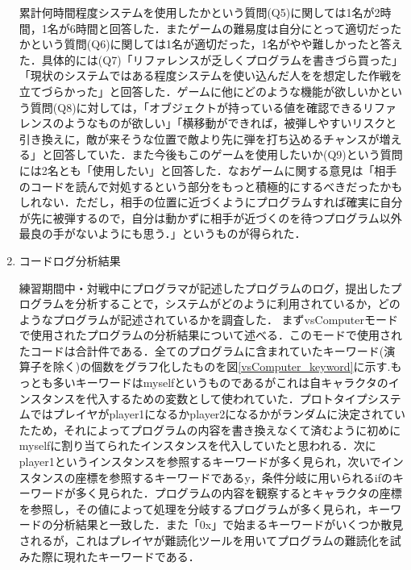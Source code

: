 \begin{enumerate}
  累計何時間程度システムを使用したかという質問(Q5)に関しては1名が2時間，1名が6時間と回答した．またゲームの難易度は自分にとって適切だったかという質問(Q6)に関しては1名が適切だった，1名がやや難しかったと答えた．具体的には(Q7)「リファレンスが乏しくプログラムを書きづら買った」「現状のシステムではある程度システムを使い込んだ人をを想定した作戦を立てづらかった」と回答した．ゲームに他にどのような機能が欲しいかという質問(Q8)に対しては，「オブジェクトが持っている値を確認できるリファレンスのようなものが欲しい」「横移動ができれば，被弾しやすいリスクと引き換えに，敵が来そうな位置で敵より先に弾を打ち込めるチャンスが増える」と回答していた．また今後もこのゲームを使用したいか(Q9)という質問には2名とも「使用したい」と回答した．なおゲームに関する意見は「相手のコードを読んで対処するという部分をもっと積極的にするべきだったかもしれない．ただし，相手の位置に近づくようにプログラムすれば確実に自分が先に被弾するので，自分は動かずに相手が近づくのを待つプログラム以外最良の手がないようにも思う．」というものが得られた．

  \item コードログ分析結果

  練習期間中・対戦中にプログラマが記述したプログラムのログ，提出したプログラムを分析することで，システムがどのように利用されているか，どのようなプログラムが記述されているかを調査した．
  まずvsComputerモードで使用されたプログラムの分析結果について述べる．このモードで使用されたコードは合計件である．全てのプログラムに含まれていたキーワード(演算子を除く)の個数をグラフ化したものを図\ref{vsComputer_keyword}に示す.もっとも多いキーワードはmyselfというものであるがこれは自キャラクタのインスタンスを代入するための変数として使われていた．プロトタイプシステムではプレイヤがplayer1になるかplayer2になるかがランダムに決定されていたため，それによってプログラムの内容を書き換えなくて済むように初めにmyselfに割り当てられたインスタンスを代入していたと思われる．次にplayer1というインスタンスを参照するキーワードが多く見られ，次いでインスタンスの座標を参照するキーワードであるy，条件分岐に用いられるifのキーワードが多く見られた．プログラムの内容を観察するとキャラクタの座標を参照し，その値によって処理を分岐するプログラムが多く見られ，キーワードの分析結果と一致した．また「0x」で始まるキーワードがいくつか散見されるが，これはプレイヤが難読化ツールを用いてプログラムの難読化を試みた際に現れたキーワードである．



\end{enumerate}
